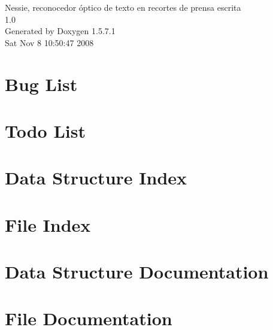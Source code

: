 \documentclass[a4paper]{article}
\begin{document}
\begin{titlepage}
\vspace*{7cm}
\begin{center}
{\Large Nessie, reconocedor óptico de texto en recortes de prensa escrita \\[1ex]\large 1.0 }\\
\vspace*{1cm}
{\large Generated by Doxygen 1.5.7.1}\\
\vspace*{0.5cm}
{\small Sat Nov 8 10:50:47 2008}\\
\end{center}
\end{titlepage}
\tableofcontents
{}
\section{Bug List}
\label{bug}
\hypertarget{bug}{}

\section{Todo List}
\label{todo}
\hypertarget{todo}{}

\section{Data Structure Index}

\section{File Index}

\section{Data Structure Documentation}










\section{File Documentation}





















\printindex
\end{document}
